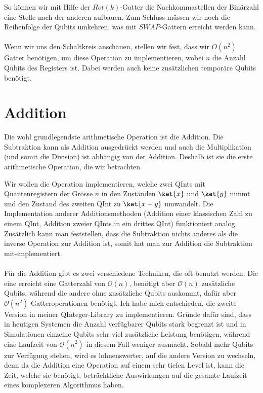 So können wir mit Hilfe der $Rot(k)$-Gatter die Nachkommastellen der Binärzahl eine Stelle nach der anderen aufbauen. Zum Schluss müssen wir noch die Reihenfolge der Qubits umkehren, was mit $SWAP$-Gattern erreicht werden kann.

\paragraph{}
Wenn wir uns den Schaltkreis anschauen, stellen wir fest, dass wir $O(n^2)$ Gatter benötigen, um diese Operation zu implementieren, wobei $n$ die Anzahl Qubits des Registers ist. Dabei werden auch keine zusätzlichen temporäre Qubits benötigt. 

\section{Addition}
Die wohl grundlegendste arithmetische Operation ist die Addition. Die Subtraktion kann als Addition ausgedrückt werden und auch die Multiplikation (und somit die Division) ist abhängig von der Addition. Deshalb ist sie die erste arithmetische Operation, die wir betrachten. 

Wir wollen die Operation implementieren, welche zwei QInts mit Quantenregistern der Grösse $n$ in den Zuständen $\ket{x}$ und $\ket{y}$ nimmt und den Zustand des zweiten QInt zu $\ket{x + y}$ umwandelt. Die Implementation anderer Additionsmethoden (Addition einer klassischen Zahl zu einem QInt, Addition zweier QInts in ein drittes QInt) funktioniert analog. Zusätzlich kann man feststellen, dass die Subtraktion nichts anderes als die inverse Operation zur Addition ist, somit hat man zur Addition die Subtraktion mit-implementiert.

\paragraph{}

Für die Addition gibt es zwei verschiedene Techniken, die oft benutzt werden. Die eine erreicht eine Gatterzahl von $\mathcal O(n)$, benötigt aber $\mathcal O(n)$ zusätzliche Qubits, während die andere ohne zusätzliche Qubits auskommt, dafür aber $\mathcal O(n^2)$ Gatteroperationen benötigt. Ich habe mich entschieden, die zweite Version in meiner QInteger-Library zu implementieren. Gründe dafür sind, dass in heutigen Systemen die Anzahl verfügbarer Qubits stark begrenzt ist und in Simulationen einzelne Qubits sehr viel zusätzliche Leistung benötigen, während eine Laufzeit von $\mathcal O(n^2)$ in diesem Fall weniger ausmacht. Sobald mehr Qubits zur Verfügung stehen, wird es lohnenswerter, auf die andere Version zu wechseln, denn da die Addition eine Operation auf einem sehr tiefen Level ist, kann die Zeit, welche sie benötigt, beträchtliche Auswirkungen auf die gesamte Laufzeit eines komplexeren Algorithmus haben.

